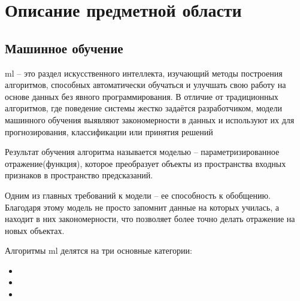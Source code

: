 \documentclass[../document.tex]{subfiles}
\begin{document}
    \section{Описание предметной области}
    \subsection{Машинное обучение}
    \par \acrfull{ml} -- это раздел искусственного интеллекта, изучающий методы построения алгоритмов, способных автоматически обучаться и улучшать свою работу на основе данных без явного программирования. В отличие от традиционных алгоритмов, где поведение системы жестко задаётся разработчиком, модели машинного обучения выявляют закономерности в данных и используют их для прогнозирования, классификации или принятия решений
    \par Результат обучения алгоритма называется моделью -- параметризированное отражение(функция), которое преобразует объекты из пространства входных признаков в пространство предсказаний. 
    \par Одним из главных требований к модели -- ее способность к обобщению. Благодаря этому модель не просто запомнит данные на которых училась, а находит в них закономерности, что позволяет более точно делать отражение на новых объектах.
    \par Алгоритмы \acrshort{ml} делятся на три основные категории:
    \begin{itemize}
        \item {}
        \item {}
        \item {}
    \end{itemize} 

    

    

    

    
    
    
    
    
\end{document}
